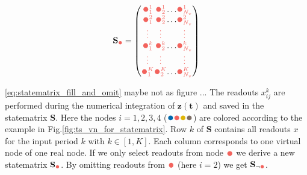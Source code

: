 \begin{equation}
\mathbf{S}_{\textcolor{myred}{\sbullet[1]}}=
\setlength{\arraycolsep}{-0.0pt}
\left(\begin{array}{ccc c}
\textcolor{myred}{\sbullet[1.5]^{1}_1}&\textcolor{myred}{\sbullet[1.5]^{1}_2}&\dots&\textcolor{myred}{\sbullet[1.5]^{1}_{N_v}}\\
\textcolor{myred}{\sbullet[1.5]^{2}_1}&\textcolor{myred}{\sbullet[1.5]^{2}_2}&\dots&\textcolor{myred}{\sbullet[1.5]^{2}_{N_v}}\\
\textcolor{myred}{\vdots}&\textcolor{myred}{\vdots}& &\textcolor{myred}{\vdots}\\
\textcolor{myred}{\sbullet[1.5]^{k}_1}&\textcolor{myred}{\sbullet[1.5]^{k}_2}&\dots&\textcolor{myred}{\sbullet[1.5]^{k}_{N_v}}\\
\textcolor{myred}{\vdots}&\textcolor{myred}{\vdots}& &\textcolor{myred}{\vdots}\\
\textcolor{myred}{\sbullet[1.5]^{K}_1}&\textcolor{myred}{\sbullet[1.5]^{K}_2}&\dots&\textcolor{myred}{\sbullet[1.5]^{K}_{N_v}}\\
\end{array}\right)
\label{eq:statematrix_fill_and_single}
\end{equation}


\ref{eq:statematrix_fill_and_omit} maybe not as figure ... 
The readouts $x^k_{ij}$ are performed during the numerical integration of $\mathbf{z(t)}$ and saved in the statematrix $\mathbf{S}$. Here the nodes $i= 1,2,3,4 $ ($\textcolor{myblue}{\sbullet[1.5]}\textcolor{myred}{\sbullet[1.5]}\textcolor{myyellow}{\sbullet[1.5]}\textcolor{mybrown}{\sbullet[1.5]}$) are colored according to the example in Fig.\ref{fig:ts_vn_for_statematrix}. Row $k$ of $\mathbf{S}$ contains all readouts $x$ for the input period $k$ with $k \in [1,K]$. Each column corresponds to one virtual node of one real node. If we only select readouts from node $\textcolor{myred}{\sbullet[1.5]}$ we derive a new statematrix $\mathbf{S}_{\textcolor{myred}{\sbullet[1]}}$. By omitting readouts from $\textcolor{myred}{\sbullet[1.5]}$ (here $i=2$) we get  $\textbf{S}_{\neg \textcolor{myred}{\sbullet[1]}}$. 






	
	
